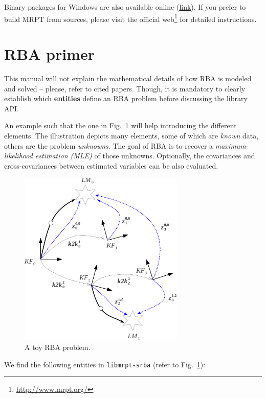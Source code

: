 \documentclass[a4paper,11pt]{article}
\begin{document}
Binary packages for Windows are also available online (\href{http://www.mrpt.org/download}{link}).
If you prefer to build MRPT from sources, please visit the official web\footnote{\href{http://www.mrpt.org/}{http://www.mrpt.org/}} 
for detailed instructions.


\section{RBA primer}
\label{sect:rba_primer}

This manual will not explain the mathematical details of how RBA is modeled and solved -- please, refer to cited papers.
Though, it is mandatory to clearly establish which \textbf{entities} define an RBA problem before discussing the library API.

An example such that the one in Fig.~\ref{fig:rba.entities} will help introducing the different elements.
The illustration depicts many elements, some of which are \emph{known} data, others are the problem \emph{unknowns}. 
The goal of RBA is to recover a \emph{maximum-likelihood estimation (MLE)} of those unknowns. Optionally, the covariances and 
cross-covariances between estimated variables can be also evaluated.

\begin{figure}
\centering
\includegraphics[width=0.7\textwidth]{imgs/srba_toy_problem.pdf} 
\caption{A toy RBA problem.}
\label{fig:rba.entities}
\end{figure}

We find the following entities in \texttt{libmrpt-srba} (refer to Fig.~\ref{fig:rba.entities}):
\end{document}
